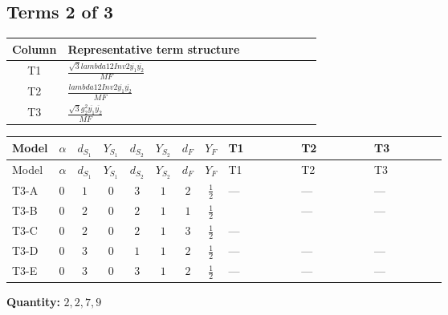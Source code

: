 \documentclass[8pt]{article}
\begin{document}
\begin{landscape}
\subsection*{Terms 2 of 3}
\begin{center}
\begin{tabular}{@{}c >{\raggedright\arraybackslash}p{0.82\linewidth}@{}}
\toprule
Column & Representative term structure \\
\midrule
T1 & \(\displaystyle \frac{\sqrt{3} lambda12Inv2 \overline{y_{1}} \overline{y_{2}}}{MF}\) \\
\midrule
T2 & \(\displaystyle \frac{lambda12Inv2 \overline{y_{1}} \overline{y_{2}}}{MF}\) \\
\midrule
T3 & \(\displaystyle \frac{\sqrt{3} g_{2}^{2} \overline{y_{1}} \overline{y_{2}}}{MF}\) \\
\midrule
\bottomrule
\end{tabular}
\end{center}
\smallskip
\tiny
\begin{longtable}{@{}llcccccc >{\raggedright\arraybackslash}p{0.21\linewidth} >{\raggedright\arraybackslash}p{0.21\linewidth} >{\raggedright\arraybackslash}p{0.21\linewidth}@{}}
\toprule
Model & $\alpha$ & $d_{S_1}$ & $Y_{S_1}$ & $d_{S_2}$ & $Y_{S_2}$ & $d_F$ & $Y_F$ & T1 & T2 & T3 \\
\midrule
\endfirsthead
\toprule
Model & $\alpha$ & $d_{S_1}$ & $Y_{S_1}$ & $d_{S_2}$ & $Y_{S_2}$ & $d_F$ & $Y_F$ & T1 & T2 & T3 \\
\midrule
\endhead
T3-A & $0$ & $1$ & $0$ & $3$ & $1$ & $2$ & $\frac{1}{2}$ & --- & --- & --- \\
\midrule
T3-B & $0$ & $2$ & $0$ & $2$ & $1$ & $1$ & $\frac{1}{2}$ & \scriptsize\adjustbox{max width=\linewidth}{$\begin{gathered} \frac{\sqrt{3} lambda12Inv2 \overline{y_{1}} \overline{y_{2}}}{3 MF}\end{gathered}$} & --- & --- \\
\midrule
T3-C & $0$ & $2$ & $0$ & $2$ & $1$ & $3$ & $\frac{1}{2}$ & --- & \scriptsize\adjustbox{max width=\linewidth}{$\begin{gathered} - \frac{lambda12Inv2 \overline{y_{1}} \overline{y_{2}}}{3 MF}\end{gathered}$} & \scriptsize\adjustbox{max width=\linewidth}{$\begin{gathered} - \frac{\sqrt{3} g_{2}^{2} \overline{y_{1}} \overline{y_{2}}}{4 MF}\end{gathered}$} \\
\midrule
T3-D & $0$ & $3$ & $0$ & $1$ & $1$ & $2$ & $\frac{1}{2}$ & --- & --- & --- \\
\midrule
T3-E & $0$ & $3$ & $0$ & $3$ & $1$ & $2$ & $\frac{1}{2}$ & --- & --- & --- \\
\midrule
\bottomrule
\end{longtable}
\clearpage
\noindent\textbf{Quantity: }$\mathrm{2,2,7,9}$\par\smallskip

\end{landscape}
\end{document}
